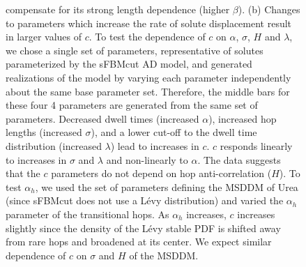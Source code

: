 \documentclass[12pt]{article}
\begin{document}
\begin{figure}
{  compensate for its strong length dependence (higher $\beta$). (b) Changes to parameters
  which increase the rate of solute displacement result in larger values of $c$. 
  To test the dependence of $c$ on $\alpha$, $\sigma$, $H$ and $\lambda$, we chose a 
  single set of parameters, representative of solutes parameterized by the sFBMcut AD model,
  and generated realizations of the model by varying each parameter independently about the
  same base parameter set. Therefore, the middle bars for these four 4 parameters are 
  generated from the same set of parameters. Decreased dwell times (increased $\alpha$),
  increased hop lengths (increased $\sigma$), and a lower cut-off to the dwell time
  distribution (increased $\lambda$) lead to increases in $c$. $c$ responds linearly
  to increases in $\sigma$ and $\lambda$ and non-linearly to $\alpha$. The data 
  suggests that the $c$ parameters do not depend on hop anti-correlation ($H$). To test 
  $\alpha_h$, we used the set of parameters defining the MSDDM of Urea (since sFBMcut does
  not use a L\'evy distribution) and varied the $\alpha_h$ parameter of the transitional
  hops. As $\alpha_h$ increases, $c$ increases slightly since the density of the L\'evy
  stable PDF is shifted away from rare hops and broadened at its center.
  We expect similar dependence of $c$ on $\sigma$ and $H$ of the MSDDM.}\label{fig:c}
  \end{figure}
  

\end{document}
